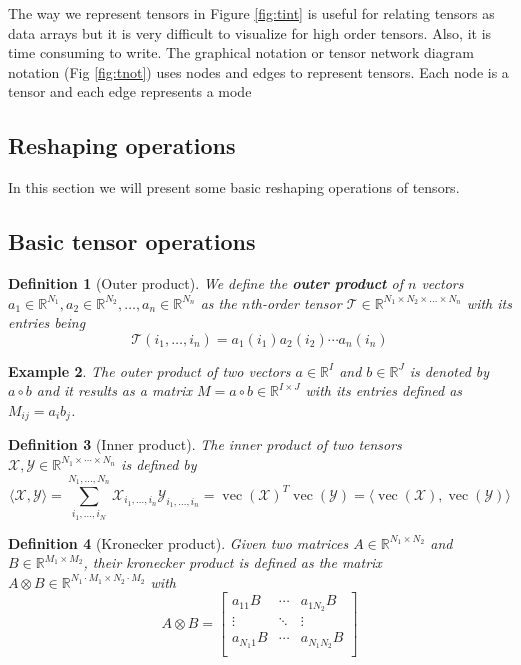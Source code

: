 \documentclass[11pt,a4paper,openright,oneside]{book}
\numberwithin{equation}{section}
\newtheorem{defn0}{Definition}[chapter]
\newtheorem{example0}[defn0]{Example}
\newenvironment{definition}{ \begin{defn0}}{\end{defn0}}
\newenvironment{example}{ \begin{example0}\rm}{\end{example0}}
\DeclareMathOperator{\vectorize}{vec}
\begin{document}
The way we represent tensors in Figure \ref{fig:tint} is useful for
relating tensors as data arrays but it is very difficult to visualize for high order tensors. Also, it is time consuming
to write. The graphical notation or tensor network diagram notation (Fig \ref{fig:tnot}) uses nodes and edges to represent tensors. Each node is
a tensor and each edge represents a mode

\subsection{Reshaping operations}

In this section we will present some basic reshaping operations of tensors.

\subsection{Basic tensor operations}

\begin{definition}[Outer product]
    We define the \textbf{outer product} of $n$ vectors 
    $a_1 \in \mathbb{R}^{N_1}, a_2 \in \mathbb{R}^{N_2}, \dots, a_n \in \mathbb{R}^{N_n}$
    as the $n$th-order tensor $\mathcal{T} \in \mathbb{R}^{N_1 \times N_2 \times \dots \times N_n}$ with its entries being
    $$\mathcal{T}(i_1, \dots, i_n) = a_1(i_1) a_2(i_2) \cdots a_n(i_n)$$
\end{definition}

\begin{example}
The outer product of two vectors $a \in \mathbb{R}^I$ and $b \in \mathbb{R}^J$ is denoted by $a \circ b$ and it results
as a matrix $M = a \circ b \in \mathbb{R}^{I \times J}$ with its entries defined as $M_{ij} = a_i b_j$.
\end{example}


\begin{definition}[Inner product]
The inner product of two tensors $\mathcal{X}, \mathcal{Y} \in \mathbb{R}^{N_1 \times \cdots \times N_n}$ is defined by
$$\langle \mathcal{X},\mathcal{Y} \rangle = \sum_{i_1, \dots, i_N}^{N_1, \dots, N_n} \mathcal{X}_{i_1, \dots, i_n} \mathcal{Y}_{i_1, \dots, i_n} = 
\vectorize(\mathcal{X})^T \vectorize(\mathcal{Y}) = \langle \vectorize(\mathcal{X}), \vectorize(\mathcal{Y}) \rangle$$
\end{definition}


\begin{definition}[Kronecker product]
     Given two matrices $A \in \mathbb{R}^{N_1 \times N_2}$ and $B \in \mathbb{R}^{M_1 \times M_2}$,
    their kronecker product is defined as the matrix $A \otimes B \in \mathbb{R}^{N_1 \cdot M_1 \times N_2 \cdot M_2}$ with
    $$A \otimes B = \begin{bmatrix}
        a_{11}B & \cdots & a_{1N_2}B \\ 
        \vdots & \ddots & \vdots \\
        a_{N_1 1}B & \cdots & a_{N_1 N_2}B \\
    \end{bmatrix}$$
\end{definition}
\end{document}
